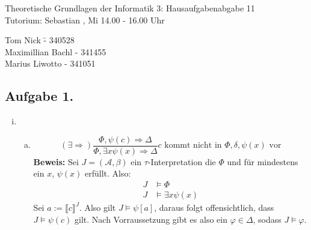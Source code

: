 \documentclass[a4paper,10pt]{article}
\begin{document}
\begin{center}
\Large{Theoretische Grundlagen der Informatik 3: Hausaufgabenabgabe 11} \\
\large{Tutorium: Sebastian , Mi 14.00 - 16.00 Uhr}
\end{center}
\begin{tabbing}
Tom Nick \hspace{2cm}\= - 340528\\
Maximillian Bachl \> - 341455 \\
Marius Liwotto\> -  341051
\end{tabbing}
\subsection*{Aufgabe 1.}
\begin{enumerate}[(i)]
	\item
	\begin{enumerate}[a)]
	Das untenstehende Sequenzkalkül ist korrekt:
		\item \[ (\exists \Rightarrow) \frac{\Phi, \psi(c) \Rightarrow \Delta}{\Phi, \exists x \psi(x)\Rightarrow \Delta} c \text{ kommt nicht in $\Phi,\delta,\psi(x)$ vor}\]
		\textbf{Beweis:} 
		Sei $J = (\mathcal{A},\beta)$ ein $\tau$-Interpretation die $\Phi$ und für mindestens ein $x$, $\psi(x)$ erfüllt. Also:
		\begin{align*}
			J &\vDash \Phi \\
			J &\vDash \exists x \psi(x)
		\end{align*}
		Sei $a := \llbracket c \rrbracket^{J}$. Also gilt $J \vDash \psi[a]$, daraus folgt offensichtlich, dass $J \vDash \psi(c)$ gilt. Nach Vorraussetzung gibt es also ein $\varphi \in \Delta$, sodass $J \vDash \varphi$.
	\end{enumerate}
\end{enumerate}

	
\end{document}
